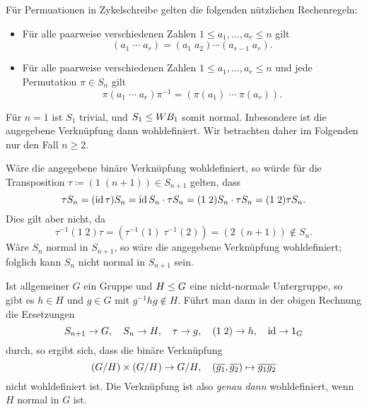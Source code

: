 \section{}





\subsection{}

\begin{remark}
  Für Permuationen in Zykelschreibe gelten die folgenden nützlichen Rechenregeln:
  \begin{itemize}
    \item
      Für alle paarweise verschiedenen Zahlen $1 \leq a_1, \dotsc, a_r \leq n$ gilt
      \[
          (a_1 \; \dotsm \; a_r)
        = (a_1 \; a_2) \dotsm (a_{r-1} \; a_r).
      \]
    \item
      Für alle paarweise verschiedenen Zahlen $1 \leq a_1, \dotsc, a_r \leq n$ und jede Permutation $\pi \in S_n$ gilt
      \[
          \pi (a_1 \; \dotsm \; a_r) \pi^{-1}
        = ( \pi(a_1) \; \dotsm \; \pi(a_r) ).
      \]
  \end{itemize}
\end{remark}

Für $n = 1$ ist $S_1$ trivial, und $S_1 \leq WB_1$ somit normal.
Inbesondere ist die angegebene Verknüpfung dann wohldefiniert.
Wir betrachten daher im Folgenden nur den Fall $n \geq 2$.

Wäre die angegebene binäre Verknüpfung wohldefiniert, so würde für die Transposition $\tau \coloneqq (1 \; (n+1)) \in S_{n+1}$ gelten, dass
\[
    \tau S_n
  = (\operatorname{id} \tau) S_n
  = \operatorname{id} S_n \cdot \tau S_n
  = (1 \; 2) S_n \cdot \tau S_n
  = (1 \; 2)\tau S_n.
\]
Dies gilt aber nicht, da
\[
          \tau^{-1} (1 \; 2) \tau
  =       ( \tau^{-1}(1) \; \tau^{-1}(2) )
  =       (2 \; (n+1))
  \notin  S_n.
\]
Wäre $S_n$ normal in $S_{n+1}$, so wäre die angegebene Verknüpfung wohldefiniert;
folglich kann $S_n$ nicht normal in $S_{n+1}$ sein.

\begin{remark}
  Ist allgemeiner $G$ ein Gruppe und $H \leq G$ eine nicht-normale Untergruppe, so gibt es $h \in H$ und $g \in G$ mit $g^{-1} h g \notin H$.
  Führt man dann in der obigen Rechnung die Ersetzungen
  \[
    S_{n+1}   \to G,
    \quad
    S_n       \to H,
    \quad
    \tau      \to g,
    \quad
    (1 \; 2)  \to h,
    \quad
    \operatorname{id}       \to 1_G
  \]
  durch, so ergibt sich, dass die binäre Verknüpfung
  \[
            (G/H) \times (G/H)
    \to     G/H,
    \quad   (\overline{g_1}, \overline{g_2})
    \mapsto \overline{g_1 g_2}
  \]
  nicht wohldefiniert ist.
  Die Verknüpfung ist also \emph{genau dann} wohldefiniert, wenn $H$ normal in $G$ ist.
\end{remark}





